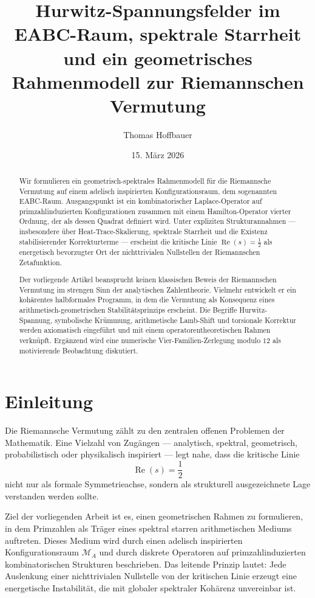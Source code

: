 \documentclass[11pt,a4paper]{amsart}
\title[Hurwitz-Spannungsfelder im EABC-Raum]{Hurwitz-Spannungsfelder im EABC-Raum, spektrale Starrheit und ein geometrisches Rahmenmodell zur Riemannschen Vermutung}
\author{Thomas Hoffbauer}
\date{15. März 2026}
\theoremstyle{plain}
\theoremstyle{definition}
\theoremstyle{remark}
\newcommand{\RePart}{\operatorname{Re}}
\newcommand{\MA}{\mathcal{M}_A}
\begin{document}
	
	\begin{abstract}
		Wir formulieren ein geometrisch-spektrales Rahmenmodell für die Riemannsche Vermutung auf einem adelisch inspirierten Konfigurationsraum, dem sogenannten EABC-Raum. Ausgangspunkt ist ein kombinatorischer Laplace-Operator auf primzahlinduzierten Konfigurationen zusammen mit einem Hamilton-Operator vierter Ordnung, der als dessen Quadrat definiert wird. Unter expliziten Strukturannahmen --- insbesondere über Heat-Trace-Skalierung, spektrale Starrheit und die Existenz stabilisierender Korrekturterme --- erscheint die kritische Linie $\RePart(s)=\tfrac12$ als energetisch bevorzugter Ort der nichttrivialen Nullstellen der Riemannschen Zetafunktion.
		
		Der vorliegende Artikel beansprucht keinen klassischen Beweis der Riemannschen Vermutung im strengen Sinn der analytischen Zahlentheorie. Vielmehr entwickelt er ein kohärentes halbformales Programm, in dem die Vermutung als Konsequenz eines arithmetisch-geometrischen Stabilitätsprinzips erscheint. Die Begriffe Hurwitz-Spannung, symbolische Krümmung, arithmetische Lamb-Shift und torsionale Korrektur werden axiomatisch eingeführt und mit einem operatorentheoretischen Rahmen verknüpft. Ergänzend wird eine numerische Vier-Familien-Zerlegung modulo \(12\) als motivierende Beobachtung diskutiert.
	\end{abstract}
	
	\maketitle
	
	\tableofcontents
	
	\section{Einleitung}
	
	Die Riemannsche Vermutung zählt zu den zentralen offenen Problemen der Mathematik. Eine Vielzahl von Zugängen --- analytisch, spektral, geometrisch, probabilistisch oder physikalisch inspiriert --- legt nahe, dass die kritische Linie
	\[
	\RePart(s)=\frac12
	\]
	nicht nur als formale Symmetrieachse, sondern als strukturell ausgezeichnete Lage verstanden werden sollte.
	
	Ziel der vorliegenden Arbeit ist es, einen geometrischen Rahmen zu formulieren, in dem Primzahlen als Träger eines spektral starren arithmetischen Mediums auftreten. Dieses Medium wird durch einen adelisch inspirierten Konfigurationsraum $\MA$ und durch diskrete Operatoren auf primzahlinduzierten kombinatorischen Strukturen beschrieben. Das leitende Prinzip lautet: Jede Auslenkung einer nichttrivialen Nullstelle von der kritischen Linie erzeugt eine energetische Instabilität, die mit globaler spektraler Kohärenz unvereinbar ist.
	
\end{document}

